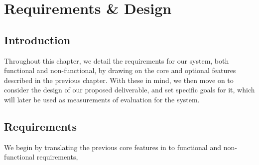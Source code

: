 \chapter{Requirements \& Design}

\section{Introduction}
Throughout this chapter, we detail the requirements for our system, both functional and non-functional, by drawing on the core and optional features described in the previous chapter. With these in mind, we then move on to consider the design of our proposed deliverable, and set specific goals for it, which will later be used as measurements of evaluation for the system.

\section{Requirements}
We begin by translating the previous core features in to functional and non-functional requirements, 
